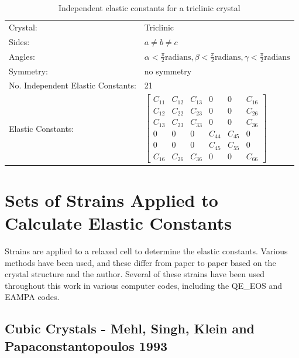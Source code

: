 \renewcommand{\arraystretch}{1.7}
\begin{table}[!htbp]
\begin{tabular}{ll}
Crystal: & Triclinic \\
Sides: & $a \ne b \ne c$ \\
Angles: & $ \alpha < \frac{\pi}{2} \text{radians}, \beta < \frac{\pi}{2} \text{radians}, \gamma < \frac{\pi}{2} \text{radians} $ \\
Symmetry: & no symmetry \\
No. Independent Elastic Constants: & 21  \\
Elastic Constants: & $ \begin{bmatrix} C_{11} & C_{12} & C_{13} & 0 & 0 & C_{16} \\ C_{12} & C_{22} & C_{23} & 0 & 0 & C_{26} \\ C_{13} & C_{23} & C_{33} & 0 & 0 & C_{36} \\ 0 & 0 & 0 & C_{44} & C_{45} & 0 \\ 0 & 0 & 0 & C_{45} & C_{55} & 0 \\ C_{16} & C_{26} & C_{36} & 0 & 0 & C_{66} \end{bmatrix} $ \\
\end{tabular}
\label{tab:elastictriclinic}
\caption{Independent elastic constants for a triclinic crystal\cite{typesofelasticstrain}}
\end{table}


\FloatBarrier
\section{Sets of Strains Applied to Calculate Elastic Constants}

Strains are applied to a relaxed cell to determine the elastic constants.  Various methods have been used, and these differ from paper to paper based on the crystal structure and the author.  Several of these strains have been used throughout this work in various computer codes, including the QE\_EOS and EAMPA codes.

\subsection{Cubic Crystals - Mehl, Singh, Klein and Papaconstantopoulos 1993}

